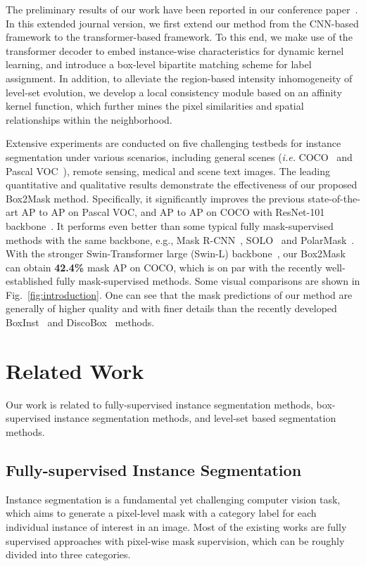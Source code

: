 \documentclass[12pt,onecolumn,letterpaper]{article}
\begin{document}
The preliminary results of our work have been reported in our conference paper~\cite{li2022box}. In this extended journal version, we first extend our method from the CNN-based framework to the transformer-based framework. To this end, we make use of the transformer decoder to embed instance-wise characteristics for dynamic kernel learning, and introduce a box-level bipartite matching scheme for label assignment. In addition, to alleviate the region-based intensity inhomogeneity of level-set evolution, we develop a local consistency module based on an affinity kernel function, which further mines the pixel similarities and spatial relationships within the neighborhood. 

Extensive experiments are conducted on five challenging testbeds for instance segmentation under various scenarios, including general scenes (\textit{i.e.} COCO~\cite{lin2014microsoft} and Pascal VOC~\cite{pascalvoc2010}), remote sensing, medical  and scene text images. The leading quantitative and qualitative results demonstrate the effectiveness of our proposed Box2Mask method. Specifically, it significantly improves the previous state-of-the-art  AP to  AP on Pascal VOC, and  AP to  AP on COCO with ResNet-101 backbone~\cite{he2016deep}.
It performs even better than some typical fully mask-supervised methods with the same backbone, e.g., Mask R-CNN~\cite{iccv2017maskrcnn}, SOLO~\cite{wang2020solo} and PolarMask~\cite{cvpr_2020polarmask}. With the stronger Swin-Transformer large (Swin-L) backbone~\cite{liu2021swin}, our Box2Mask can obtain \textbf{42.4\%} mask AP on COCO, which is on par with the recently well-established fully mask-supervised methods.
Some visual comparisons are shown in Fig.~\ref{fig:introduction}. One can see that the mask predictions of our method are generally of higher quality and with finer details than the recently developed BoxInst~\cite{cvpr2021_boxinst} and DiscoBox~\cite{iccv2021discobox} methods.

\section{Related Work}
Our work is related to fully-supervised instance segmentation methods, box-supervised instance segmentation methods, and level-set based segmentation methods.

\subsection{Fully-supervised Instance Segmentation}
Instance segmentation is a fundamental yet challenging computer vision task, which aims to generate a pixel-level mask with a category label for each individual instance of interest in an image. 
Most of the existing works are fully supervised approaches with pixel-wise mask supervision, which can be roughly divided into three categories. 
\end{document}
